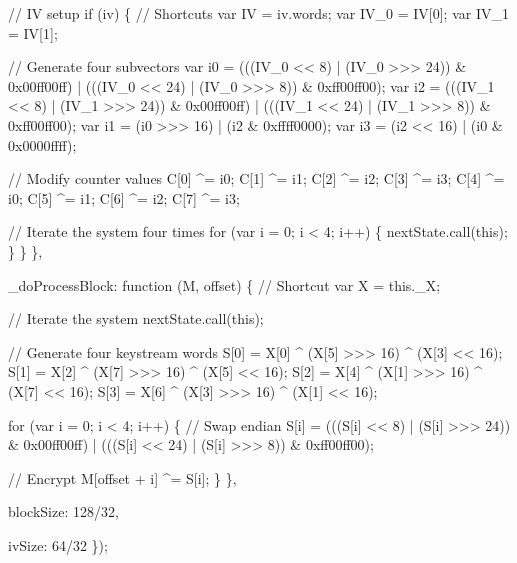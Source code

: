 \begin{DoxyCodeInclude}
            \textcolor{comment}{// IV setup}
            \textcolor{keywordflow}{if} (iv) \{
                \textcolor{comment}{// Shortcuts}
                var IV = iv.words;
                var IV\_0 = IV[0];
                var IV\_1 = IV[1];

                \textcolor{comment}{// Generate four subvectors}
                var i0 = (((IV\_0 << 8) | (IV\_0 >>> 24)) & 0x00ff00ff) | (((IV\_0 << 24) | (IV\_0 >>> 8)) & 
      0xff00ff00);
                var i2 = (((IV\_1 << 8) | (IV\_1 >>> 24)) & 0x00ff00ff) | (((IV\_1 << 24) | (IV\_1 >>> 8)) & 
      0xff00ff00);
                var i1 = (i0 >>> 16) | (i2 & 0xffff0000);
                var i3 = (i2 << 16)  | (i0 & 0x0000ffff);

                \textcolor{comment}{// Modify counter values}
                C[0] ^= i0;
                C[1] ^= i1;
                C[2] ^= i2;
                C[3] ^= i3;
                C[4] ^= i0;
                C[5] ^= i1;
                C[6] ^= i2;
                C[7] ^= i3;

                \textcolor{comment}{// Iterate the system four times}
                \textcolor{keywordflow}{for} (var i = 0; i < 4; i++) \{
                    nextState.call(\textcolor{keyword}{this});
                \}
            \}
        \},

        \_doProcessBlock: \textcolor{keyword}{function} (M, offset) \{
            \textcolor{comment}{// Shortcut}
            var X = this.\_X;

            \textcolor{comment}{// Iterate the system}
            nextState.call(\textcolor{keyword}{this});

            \textcolor{comment}{// Generate four keystream words}
            S[0] = X[0] ^ (X[5] >>> 16) ^ (X[3] << 16);
            S[1] = X[2] ^ (X[7] >>> 16) ^ (X[5] << 16);
            S[2] = X[4] ^ (X[1] >>> 16) ^ (X[7] << 16);
            S[3] = X[6] ^ (X[3] >>> 16) ^ (X[1] << 16);

            \textcolor{keywordflow}{for} (var i = 0; i < 4; i++) \{
                \textcolor{comment}{// Swap endian}
                S[i] = (((S[i] << 8)  | (S[i] >>> 24)) & 0x00ff00ff) |
                       (((S[i] << 24) | (S[i] >>> 8))  & 0xff00ff00);

                \textcolor{comment}{// Encrypt}
                M[offset + i] ^= S[i];
            \}
        \},

        blockSize: 128/32,

        ivSize: 64/32
    \});


\end{DoxyCodeInclude}

